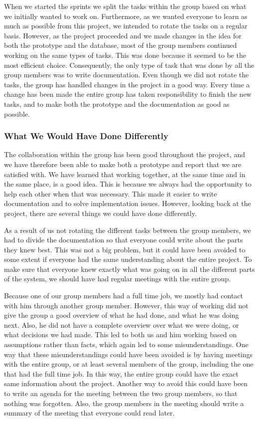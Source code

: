 \documentclass[../document]{subfiles}
\begin{document}
When we started the sprints we split the tasks within the group based on what we initially wanted to work on. Furthermore, as we wanted everyone to learn as much as possible from this project, we intended to rotate the tasks on a regular basis. However, as the project proceeded and we made changes in the idea for both the prototype and the database, most of the group members continued working on the same types of tasks. This was done because it seemed to be the most efficient choice. Consequently, the only type of task that was done by all the group members was to write documentation. Even though we did not rotate the tasks, the group has handled changes in the project in a good way. Every time a change has been made the entire group has taken responsibility to finish the new tasks, and to make both the prototype and the documentation as good as possible.

\subsubsection{What We Would Have Done Differently}
The collaboration within the group has been good throughout the project, and we have therefore been able to make both a prototype and report that we are satisfied with. We have learned that working together, at the same time and in the same place, is a good idea. This is because we always had the opportunity to help each other when that was necessary. This made it easier to write documentation and to solve implementation issues. However, looking back at the project, there are several things we could have done differently. 

As a result of us not rotating the different tasks between the group members, we had to divide the documentation so that everyone could write about the parts they knew best. This was not a big problem, but it could have been avoided to some extent if everyone had the same understanding about the entire project. To make sure that everyone knew exactly what was going on in all the different parts of the system, we should have had regular meetings with the entire group. 

Because one of our group members had a full time job, we mostly had contact with him through another group member. However, this way of working did not give the group a good overview of what he had done, and what he was doing next. Also, he did not have a complete overview over what we were doing, or what decisions we had made. This led to both us and him working based on assumptions rather than facts, which again led to some misunderstandings. One way that these misunderstandings could have been avoided is by having meetings with the entire group, or at least several members of the group, including the one that had the full time job. In this way, the entire group could have the exact same information about the project. Another way to avoid this could have been to write an agenda for the meeting between the two group members, so that nothing was forgotten. Also, the group members in the meeting should write a summary of the meeting that everyone could read later. 
\end{document}
